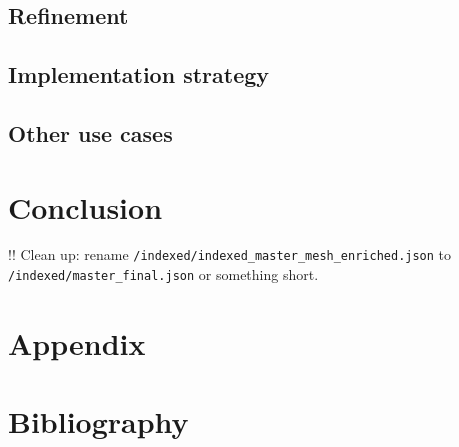 \hypertarget{refinement}{%
\subsection{Refinement}\label{refinement}}

\hypertarget{implementation-strategy}{%
\subsection{Implementation strategy}\label{implementation-strategy}}

\hypertarget{other-use-cases}{%
\subsection{Other use cases}\label{other-use-cases}}

\hypertarget{conclusion}{%
\section{Conclusion}\label{conclusion}}

!! Clean up: rename
\texttt{/indexed/indexed\_master\_mesh\_enriched.json} to
\texttt{/indexed/master\_final.json} or something short.

\hypertarget{appendix}{%
\section{Appendix}\label{appendix}}

\hypertarget{bibliography}{%
\section{Bibliography}\label{bibliography}}

